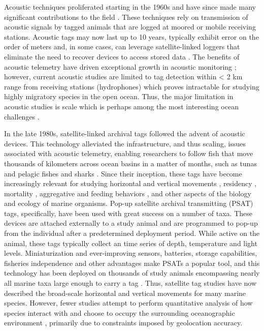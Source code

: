 Acoustic techniques proliferated starting in the 1960s and have since made many significant contributions to the field \citep[\eg][]{Carey1981, Carey1990}. These techniques rely on transmission of acoustic signals by tagged animals that are logged at moored or mobile receiving stations. Acoustic tags may now last up to 10 years, typically exhibit error on the order of meters and, in some cases, can leverage satellite-linked loggers that eliminate the need to recover devices to access stored data \citep{Donaldson2014}. The benefits of acoustic telemetry have driven exceptional growth in acoustic monitoring \citep{Hussey2015}; however, current acoustic studies are limited to tag detection within < 2 km range from receiving stations (\eg hydrophones) which proves intractable for studying highly migratory species in the open ocean. Thus, the major limitation in acoustic studies is scale which is perhaps among the most interesting ocean challenges \citep{Stommel1963, Haury1978}. 

In the late 1980s, satellite-linked archival tags followed the advent of acoustic devices. This technology alleviated the \is infrastructure, and thus scaling, issues associated with acoustic telemetry, enabling researchers to follow fish that move thousands of kilometers across ocean basins in a matter of months, such as tunas \citep{Block2005} and pelagic fishes and sharks \citep{Block2011}. Since their inception, these tags have become increasingly relevant \citep{Hussey2015} for studying horizontal and vertical movements \citep{Block2011, Thorrold2014, Berumen2014}, residency \citep{Domeier2006}, mortality \citep{Musyl2011a}, aggregative and feeding behaviors \citep{Jorgensen2012}, and other aspects of the biology and ecology of marine organisms. Pop-up satellite archival transmitting (PSAT) tags, specifically, have been used with great success on a number of taxa. These devices are attached externally to a study animal and are programmed to pop-up from the individual after a predetermined deployment period. While active on the animal, these tags typically collect an \is time series of depth, temperature and light levels. Miniaturization and ever-improving sensors, batteries, storage capabilities, fisheries independence and other advantages make PSATs a popular tool, and this technology has been deployed on thousands of study animals encompassing nearly all marine taxa large enough to carry a tag \citep{Hussey2015}. Thus, satellite tag studies have now described the broad-scale horizontal and vertical movements for many marine species. However, fewer studies attempt to perform quantitative analysis of how species interact with and choose to occupy the surrounding oceanographic environment \citep[except see, for example,][]{Lawson2010}, primarily due to constraints imposed by geolocation accuracy.

